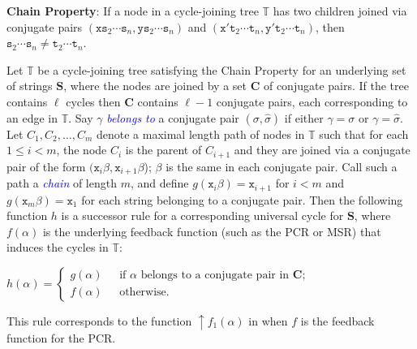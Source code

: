 \documentclass[US-letter,USenglish,authorcolumns,autoref]{lipics-v2021}
\renewcommand{\tt} {\mathtt}
\newcommand{\bS}{\mathbf{S}}
\newcommand{\defo}[1] {\emph{\textcolor{blue}{#1}}}
\newenvironment{frshaded2*}{%
    \def\FrameCommand{\fboxrule=\FrameRule\fboxsep=\FrameSep \fcolorbox{lipicsLineGray}{shadecolor}}%
    \MakeFramed {\advance\hsize-\width \FrameRestore}}%
    {\endMakeFramed}
\newenvironment{result}{
 \begin{frshaded2*}
}{%
\end{frshaded2*}

}
\begin{document}

\begin{result}
\noindent
{\bf Chain Property}: If a node in a cycle-joining tree $\mathbb{T}$ has two children joined via conjugate pairs $(\tt{x}\tt{s}_2\cdots \tt{s}_n, \tt{y}\tt{s}_2\cdots \tt{s}_n)$ and 
$(\tt{x}'\tt{t}_2\cdots \tt{t}_n, \tt{y'}\tt{t}_2\cdots \tt{t}_n)$, then $\tt{s}_2\cdots \tt{s}_n \neq \tt{t}_2\cdots \tt{t}_n$. 
\end{result}





Let $\mathbb{T}$  be a cycle-joining tree  satisfying the Chain Property for an underlying set of strings $\bS$, where the nodes are joined by a set $\mathbf{C}$ of conjugate pairs. If the tree contains $\ell$ cycles then $\mathbf{C}$ contains $\ell{-}1$ conjugate pairs, each corresponding to an edge in $\mathbb{T}$.  Say $\gamma$ \defo{belongs to} a conjugate pair $(\sigma, \hat \sigma)$ if either $\gamma = \sigma$ or $\gamma = \hat \sigma$.  
%
Let $C_1, C_2, \ldots, C_m$ denote a maximal length path of nodes in $\mathbb{T}$ such that for each $1 \leq i < m$, the node $C_i$ is the parent of $C_{i+1}$
and they are joined via a conjugate pair of the form  $(\tt{x}_i\beta, \tt{x}_{i+1}\beta$); $\beta$ is the same in each conjugate pair.  
Call such a path a \defo{chain} of length $m$, and define $g(\tt{x}_i\beta) = \tt{x}_{i+1}$ for $i < m$ and $g(\tt{x}_m\beta) = \tt{x}_1$ for each string belonging to a conjugate pair.
%
%
Then the following function $h$ is a successor rule for a corresponding universal cycle for $\mathbf{S}$,  where $f(\alpha)$ is the underlying feedback function (such as the PCR or MSR) that induces the cycles in $\mathbb{T}$:

\begin{center}
$h(\alpha) = \left\{ \begin{array}{ll}

        g(\alpha)  &\ \  \mbox{if $\alpha$ belongs to a conjugate pair  in $\mathbf{C}$;}\\
         f(\alpha) \  &\ \  \mbox{otherwise.}\end{array} \right. $
         
\end{center}
%
This rule corresponds to the function ${\uparrow}f_1(\alpha)$ in \cite{concattree} when $f$ is the feedback function for the PCR.  
\end{document}
